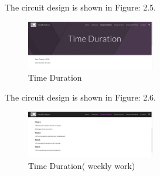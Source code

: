 \newline The circuit design is shown in Figure: 2.5.
\begin{figure}[h!] %
    \centering
    \includegraphics[width=0.5\textwidth]{3.png} %
    \caption{Time Duration}
    \label{fig:sample}
\end{figure}
\pagebreak
\newline The circuit design is shown in Figure: 2.6.
\begin{figure}[h!] %
    \centering
    \includegraphics[width=0.5\textwidth]{4.png} %
    \caption{Time Duration( weekly work)}
    \label{fig:sample}
\end{figure}

